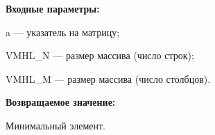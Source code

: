 \textbf{Входные параметры:}

 a --- указатель на матрицу;
 
 VMHL\_N --- размер массива (число строк);
 
 VMHL\_M --- размер массива (число столбцов).

\textbf{Возвращаемое значение:}

 Минимальный элемент.